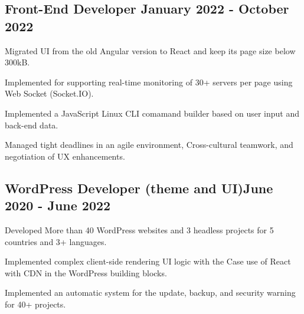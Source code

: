 \subsection{{Front-End Developer \hfill January 2022 - October 2022}}
\begin{zitemize}

             \item{
                Migrated UI from the old Angular version to React and keep its page size below 300kB.}
             \item{
                Implemented for supporting real-time monitoring of 30+ servers per page using Web Socket (Socket.IO).}
             \item{
               Implemented a JavaScript Linux CLI comamand builder based on user input and back-end data.}

             \item{
               Managed tight deadlines in an agile environment, Cross-cultural teamwork, and negotiation of UX enhancements.
}
\end{zitemize}

\subsection{{WordPress Developer (theme and UI)\hfill June 2020 - June 2022}}
\begin{zitemize}

             \item{
                Developed More than 40 WordPress websites and 3 headless projects for 5 countries and 3+ languages.}
             \item{Implemented complex client-side rendering UI logic with the Case use of React with CDN in the WordPress building blocks.}
             \item{
                Implemented an automatic system for the update, backup, and security warning for 40+ projects.}

\end{zitemize}


